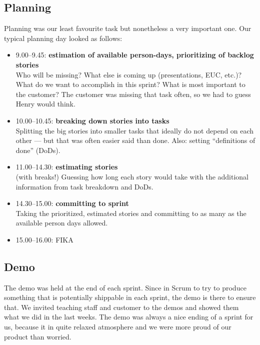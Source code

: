 \documentclass[11pt,a4paper]{report}
\begin{document}
\subsection{Planning}
Planning was our least favourite task but nonetheless a very important one.
Our typical planning day looked as follows:
\begin{itemize}
\item 9.00--9.45: {\bf estimation of available person-days,
  prioritizing of backlog stories}\\
  Who will be missing? What else is coming up (presentations, EUC, etc.)?
  What do we want to accomplish in this sprint?
  What is most important to the customer? The customer was missing that task
  often, so we had to guess Henry would think.
\item 10.00--10.45: {\bf breaking down stories into tasks}\\
  Splitting the big stories into smaller tasks that ideally do not depend on
  each other --- but that was often easier said than done.
  Also: setting ``definitions of done'' (DoDs).
\item 11.00--14.30: {\bf estimating stories}\\
  (with breaks!)
  Guessing how long each story would take with the additional information from
  task breakdown and DoDs.
\item 14.30--15.00: {\bf committing to sprint}\\
  Taking the prioritized, estimated stories and committing to as many as the
  available person days allowed.
\item 15.00--16.00: FIKA
\end{itemize}

\subsection{Demo}
The demo was held at the end of each sprint. Since in Scrum to try to produce
something that is potentially shippable in each sprint, the demo is there to
ensure that. We invited teaching staff and customer to the demos and showed them
what we did in the last weeks. The demo was always a nice ending of a sprint for
us, because it in quite relaxed atmosphere and we were more proud of our
product than worried.
\end{document}
